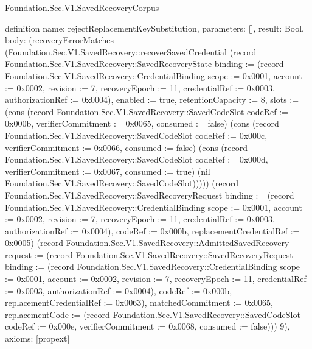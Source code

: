 \begin{lexlean}{Foundation.Sec.V1.SavedRecoveryCorpus}
\begin{semanticmodule}
definition{
  name: rejectReplacementKeySubstitution,
  parameters: [],
  result: Bool,
  body: (recoveryErrorMatches (Foundation.Sec.V1.SavedRecovery::recoverSavedCredential (record Foundation.Sec.V1.SavedRecovery::SavedRecoveryState {binding := (record Foundation.Sec.V1.SavedRecovery::CredentialBinding {scope := 0x0001, account := 0x0002, revision := 7, recoveryEpoch := 11, credentialRef := 0x0003, authorizationRef := 0x0004}), enabled := true, retentionCapacity := 8, slots := (cons (record Foundation.Sec.V1.SavedRecovery::SavedCodeSlot {codeRef := 0x000b, verifierCommitment := 0x0065, consumed := false}) (cons (record Foundation.Sec.V1.SavedRecovery::SavedCodeSlot {codeRef := 0x000c, verifierCommitment := 0x0066, consumed := false}) (cons (record Foundation.Sec.V1.SavedRecovery::SavedCodeSlot {codeRef := 0x000d, verifierCommitment := 0x0067, consumed := true}) (nil Foundation.Sec.V1.SavedRecovery::SavedCodeSlot))))}) (record Foundation.Sec.V1.SavedRecovery::SavedRecoveryRequest {binding := (record Foundation.Sec.V1.SavedRecovery::CredentialBinding {scope := 0x0001, account := 0x0002, revision := 7, recoveryEpoch := 11, credentialRef := 0x0003, authorizationRef := 0x0004}), codeRef := 0x000b, replacementCredentialRef := 0x0005}) (record Foundation.Sec.V1.SavedRecovery::AdmittedSavedRecovery {request := (record Foundation.Sec.V1.SavedRecovery::SavedRecoveryRequest {binding := (record Foundation.Sec.V1.SavedRecovery::CredentialBinding {scope := 0x0001, account := 0x0002, revision := 7, recoveryEpoch := 11, credentialRef := 0x0003, authorizationRef := 0x0004}), codeRef := 0x000b, replacementCredentialRef := 0x0063}), matchedCommitment := 0x0065, replacementCode := (record Foundation.Sec.V1.SavedRecovery::SavedCodeSlot {codeRef := 0x000e, verifierCommitment := 0x0068, consumed := false})})) 9),
  axioms: [propext]
}


\end{semanticmodule}
\end{lexlean}
